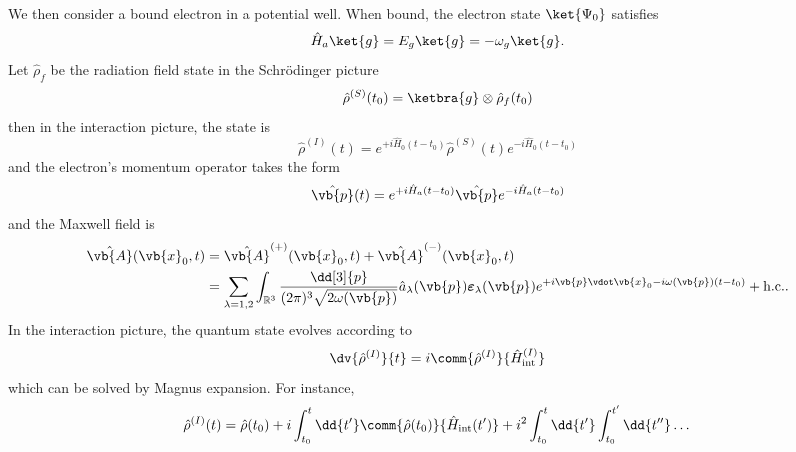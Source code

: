 We then consider a bound electron in a potential well. When bound, the electron state $\ket{\Psi_0}$ satisfies
\begin{equation}
	\hat{H}_a
	\ket{g}
	=
	E_g
	\ket{g}
	=
	-\omega_g
	\ket{g}
	.
\end{equation}
Let $\hat\rho_f$ be the radiation field state in the Schrödinger picture
\begin{equation}
	\hat\rho^{(S)}(t_0)
	=
	\ketbra{g}
	\otimes
	\hat\rho_f(t_0)
\end{equation}
then in the interaction picture, the state is~\cite[p.~685]{Mandel1995}
\begin{equation}
	\hat\rho^{(I)}(t)
	=
	e^{+i\hat{H}_0(t-t_0)}
	\hat\rho^{(S)}(t)
	e^{-i\hat{H}_0(t-t_0)}
\end{equation}
and the electron's momentum operator takes the form
\begin{equation}
	\hat{\vb{p}}(t)
	=
	e^{+i\hat{H}_a(t-t_0)}
	\hat{\vb{p}}
	e^{-i\hat{H}_a(t-t_0)}
\end{equation}
and the Maxwell field is
\begin{equation}
	\begin{split}
		\hat{\vb{A}}(\vb{x}_0,t)
		&=
		\hat{\vb{A}}^{(+)}(\vb{x}_0,t)
		+
		\hat{\vb{A}}^{(-)}(\vb{x}_0,t)
		\\
		&=
		\sum_{\lambda=1,2}
		\int_{\mathbb{R}^3}
		\frac{\dd[3]{p}}{(2\pi)^3\sqrt{2\omega(\vb{p})}}
		\hat{a}_\lambda(\vb{p})
		\boldsymbol{\varepsilon}_\lambda(\vb{p})
		e^{+i\vb{p}\vdot\vb{x}_0-i\omega(\vb{p})(t-t_0)}
		+
		\text{h.c.}
		.
	\end{split}
\end{equation}
In the interaction picture, the quantum state evolves according to
\begin{equation}
	\dv{\hat\rho^{(I)}}{t}
	=
	i\comm{\hat\rho^{(I)}}{\hat{H}^{(I)}_\text{int}}
\end{equation}
which can be solved by Magnus expansion.
For instance,
\begin{equation}
	\hat\rho^{(I)}(t)
	=
	\hat\rho(t_0)
	+
	i\int_{t_0}^t\dd{t^\prime}
	\comm{\hat\rho(t_0)}{\hat{H}_\text{int}(t^\prime)}
	+
	i^2
	\int_{t_0}^t\dd{t^\prime}
	\int_{t_0}^{t^\prime}\dd{t^{\prime\prime}}
	\dots
\end{equation}

